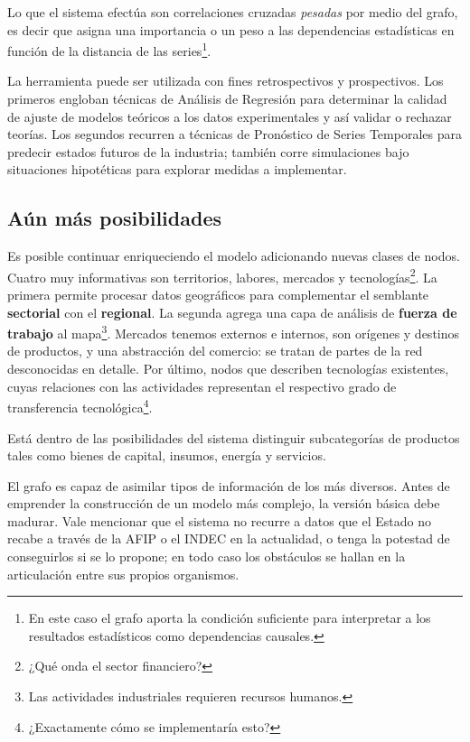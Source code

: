 \documentclass[a4paper]{report}
\begin{document}
Lo que el sistema efectúa son correlaciones cruzadas \textit{pesadas} por medio del grafo, es decir que asigna una importancia o un peso a las dependencias estadísticas en función de la distancia de las series\footnote{En este caso el grafo aporta la condición suficiente para interpretar a los resultados estadísticos como dependencias causales.}.

La herramienta puede ser utilizada con fines retrospectivos y prospectivos. Los primeros engloban técnicas de Análisis de Regresión para determinar la calidad de ajuste de modelos teóricos a los datos experimentales y así validar o rechazar teorías. Los segundos recurren a técnicas de Pronóstico de Series Temporales para predecir estados futuros de la industria; también corre simulaciones bajo situaciones hipotéticas para explorar medidas a implementar.

\subsection*{Aún más posibilidades}

Es posible continuar enriqueciendo el modelo adicionando nuevas clases de nodos. Cuatro muy informativas son territorios, labores, mercados y tecnologías\footnote{¿Qué onda el sector financiero?}. La primera permite procesar datos geográficos para complementar el semblante \textbf{sectorial} con el \textbf{regional}. La segunda agrega una capa de análisis de \textbf{fuerza de trabajo} al mapa\footnote{Las actividades industriales requieren recursos humanos.}. Mercados tenemos externos e internos, son orígenes y destinos de productos, y una abstracción del comercio: se tratan de partes de la red desconocidas en detalle. Por último, nodos que describen tecnologías existentes, cuyas relaciones con las actividades representan el respectivo grado de transferencia tecnológica\footnote{¿Exactamente cómo se implementaría esto?}.

Está dentro de las posibilidades del sistema distinguir subcategorías de productos tales como bienes de capital, insumos, energía y servicios.

El grafo es capaz de asimilar tipos de información de los más diversos. Antes de emprender la construcción de un modelo más complejo, la versión básica debe madurar. Vale mencionar que el sistema no recurre a datos que el Estado no recabe a través de la AFIP o el INDEC en la actualidad, o tenga la potestad de conseguirlos si se lo propone; en todo caso los obstáculos se hallan en la articulación entre sus propios organismos.
\end{document}
